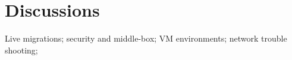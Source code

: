 \section{Discussions} \label{sec:discussion}

Live migrations; security and middle-box; VM environments; 
network trouble shooting;